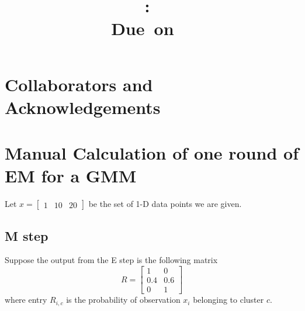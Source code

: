 \documentclass{article}
\title{
    \vspace{2in}
    \textmd{\textbf{\hmwkClass:\ \hmwkTitle}}\\
    \normalsize\vspace{0.1in}\small{Due\ on\ \hmwkDueDate\ }\\
    \vspace{3in}
}
\author{\textbf{\hmwkAuthorName}}
\date{}
\newcommand{\bbm}{\begin{bmatrix}}
\newcommand{\ebm}{\end{bmatrix}}
\begin{document}
\maketitle

\pagebreak

\section{Collaborators and Acknowledgements}


\section{Manual Calculation of one round of EM for a GMM}
Let $x=\bbm 1&10&20\ebm$ be the set of 1-D data points we are given.

\subsection{M step}
Suppose the output from the E step is the following matrix
\[
    R = \bbm 1 & 0 \\ 0.4 &0.6 \\ 0 & 1 \ebm
\]
where entry $R_{i,c}$ is the probability of observation $x_i$ belonging to cluster $c$.
\end{document}

